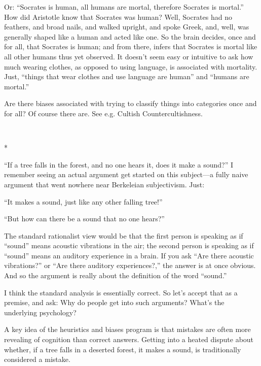 {
 Or: ``Socrates is human, all humans are mortal,
therefore Socrates is mortal.'' How did Aristotle
know that Socrates was human? Well, Socrates had no feathers, and broad
nails, and walked upright, and spoke Greek, and, well, was generally
shaped like a human and acted like one. So the brain decides, once and
for all, that Socrates is human; and from there, infers that Socrates
is mortal like all other humans thus yet observed. It
doesn't seem easy or intuitive to ask how much wearing
clothes, as opposed to using language, is associated with mortality.
Just, ``things that wear clothes and use language are
human'' and ``humans are
mortal.''}

{
 Are there biases associated with trying to classify things into
categories once and for all? Of course there are. See e.g. Cultish
Countercultishness.}

{\centering
 \ ~
\par}

{\centering
 *
\par}


{
 ``If a tree falls in the forest, and no one hears
it, does it make a sound?'' I remember seeing an
actual argument get started on this subject---a fully naive argument
that went nowhere near Berkeleian subjectivism. Just:}

{
 ``It makes a sound, just like any other falling
tree!''}

{
 ``But how can there be a sound that no one
hears?''}

{
 The standard rationalist view would be that the first person is
speaking as if ``sound'' means
acoustic vibrations in the air; the second person is speaking as if
``sound'' means an auditory
experience in a brain. If you ask ``Are there acoustic
vibrations?'' or ``Are there
auditory experiences?,'' the answer is at once
obvious. And so the argument is really about the definition of the word
``sound.''}

{
 I think the standard analysis is essentially correct. So
let's accept that as a premise, and ask: Why do people
get into such arguments? What's the underlying
psychology?}

{
 A key idea of the heuristics and biases program is that mistakes
are often more revealing of cognition than correct answers. Getting
into a heated dispute about whether, if a tree falls in a deserted
forest, it makes a sound, is traditionally considered a mistake.}


